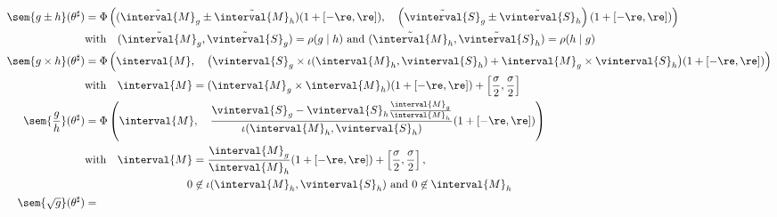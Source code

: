 \begin{figure}[ht] {\small
    \begin{displaymath}
      \begin{split}
        \sem{g \pm h}(\theta^\sharp) & =\Phi\left( (\tilde{\interval{M}}_g 
          \pm \tilde{\interval{M}}_h)(1+[-\re,\re]),\quad
          \left(\tilde{\vinterval{S}}_g \pm 
            \tilde{\vinterval{S}}_h\right)(1+[-\re,\re]) \right)
        \\
        &
        \begin{flalign*}
          \text{with}
          \quad (\tilde{\interval{M}}_g,\tilde{\vinterval{S}}_g) = 
          \rho(g \mid h)
          \text{ and } (\tilde{\interval{M}}_h,\tilde{\vinterval{S}}_h)
          = \rho(h \mid g)
        \end{flalign*}
        \\
        \sem{g \times h}(\theta^\sharp) & = \Phi 
        \left(\interval{M},\quad
          \big(
          \vinterval{S}_g \times \iota(\interval{M}_h, \vinterval{S}_h) 
          + \interval{M}_g \times \vinterval{S}_h
          \big) (1+[-\re,\re])        
        \right)
        \\
        &
        \begin{flalign*}
          \text{with}
          \quad \interval{M} = 
          (\interval{M}_g \times \interval{M}_h)(1 + [-\re,\re]) + 
          \left[\frac{\sigma}{2}, \frac{\sigma}{2}\right]
        \end{flalign*}
        \\
        \sem{\frac{g}{h}}(\theta^\sharp) & = 
        \Phi \left(
          \interval{M},\quad
          \frac{\vinterval{S}_g - \vinterval{S}_h
            \frac{\interval{M}_g}{\interval{M}_h}}
          {\iota(\interval{M}_h, \vinterval{S}_h)} (1+[-\re,\re])
        \right) 
\\
        &
        \begin{flalign*}
          \begin{split}
          \text{with}\quad
          \interval{M} & =  
          \frac{\interval{M}_g}{\interval{M}_h}(1 + [-\re,\re]) + 
          \left[\frac{\sigma}{2}, \frac{\sigma}{2}\right],
          \\
          0 & \not\in \iota(\interval{M}_h, \vinterval{S}_h) 
          \text{ and } 0 \not\in \interval{M}_h
        \end{split}
        \end{flalign*}
        \\              
        \sem{\sqrt{g}}(\theta^\sharp) & = 

\end{split}
\end{displaymath}}
\end{figure}
